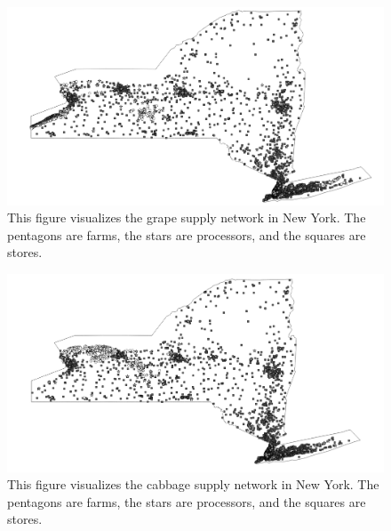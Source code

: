 \documentclass{report}
\begin{document}
\begin{figure}
\centering
\begin{framed}
\includegraphics[scale=.50]{network_69}
\caption{This figure visualizes the grape supply network in New York. The pentagons are farms, the stars are processors, and the squares are stores. }
\label{fig:network_69}
\end{framed}
\end{figure}

\begin{figure}
\centering
\begin{framed}
\includegraphics[scale=.50]{network_243}
\caption{This figure visualizes the cabbage supply network in New York. The pentagons are farms, the stars are processors, and the squares are stores.}
\label{fig:network_243}
\end{framed}
\end{figure}

\end{document}
